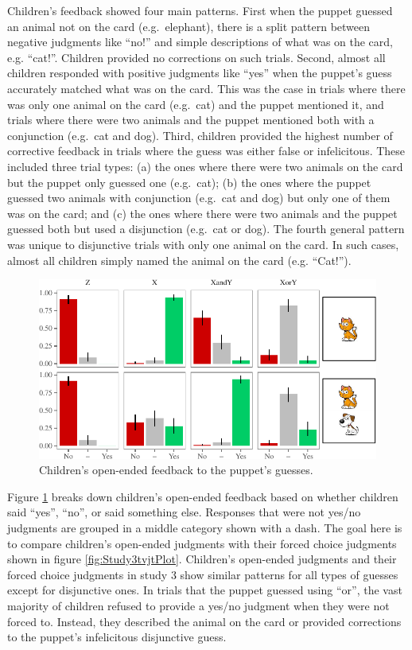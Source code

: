 \documentclass[oneside]{report}
\theoremstyle{definition}
\theoremstyle{definition}
\theoremstyle{definition}
\theoremstyle{remark}
\begin{document}
Children's feedback showed four main patterns. First when the puppet
guessed an animal not on the card (e.g.~elephant), there is a split
pattern between negative judgments like ``no!'' and simple descriptions
of what was on the card, e.g. ``cat!''. Children provided no corrections
on such trials. Second, almost all children responded with positive
judgments like ``yes'' when the puppet's guess accurately matched what
was on the card. This was the case in trials where there was only one
animal on the card (e.g.~cat) and the puppet mentioned it, and trials
where there were two animals and the puppet mentioned both with a
conjunction (e.g.~cat and dog). Third, children provided the highest
number of corrective feedback in trials where the guess was either false
or infelicitous. These included three trial types: (a) the ones where
there were two animals on the card but the puppet only guessed one
(e.g.~cat); (b) the ones where the puppet guessed two animals with
conjunction (e.g.~cat and dog) but only one of them was on the card; and
(c) the ones where there were two animals and the puppet guessed both
but used a disjunction (e.g.~cat or dog). The fourth general pattern was
unique to disjunctive trials with only one animal on the card. In such
cases, almost all children simply named the animal on the card (e.g.
``Cat!'').
\begin{figure}[t]

{\centering \includegraphics{figs/study3JudgmentPlot-1} 

}

\caption{Children's open-ended feedback to the puppet's guesses.}\label{fig:study3JudgmentPlot}
\end{figure}
Figure \ref{fig:study3JudgmentPlot} breaks down children's open-ended
feedback based on whether children said ``yes'', ``no'', or said
something else. Responses that were not yes/no judgments are grouped in
a middle category shown with a dash. The goal here is to compare
children's open-ended judgments with their forced choice judgments shown
in figure \ref{fig:Study3tvjtPlot}. Children's open-ended judgments and
their forced choice judgments in study 3 show similar patterns for all
types of guesses except for disjunctive ones. In trials that the puppet
guessed using ``or'', the vast majority of children refused to provide a
yes/no judgment when they were not forced to. Instead, they described
the animal on the card or provided corrections to the puppet's
infelicitous disjunctive guess.
\end{document}

